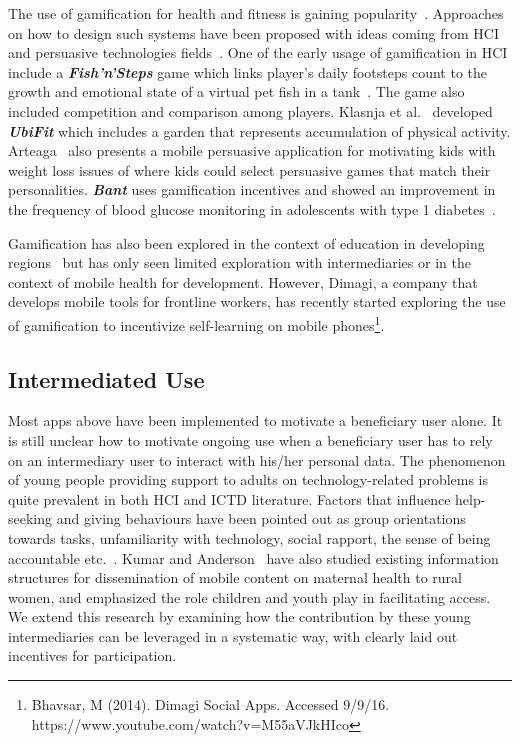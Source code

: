\documentclass{sig-alternate}
\begin{document}
The use of gamification for health and fitness is gaining popularity~\cite{lister2014:just}. Approaches on how to design such systems have been proposed with ideas coming from HCI~\cite{li2010:stage} and persuasive technologies fields~\cite{fogg2009:behaviour,Oinas-kukkonen:psd,Oinas-Kukkonen:foundation}. One of the early usage of gamification in HCI include a \emph{\textbf{Fish'n'Steps}} game which links player's daily footsteps count to the growth and emotional state of a virtual pet fish in a tank~\cite{lin2006:fish}. The game also included competition and comparison among players. Klasnja et al.~\cite{klasnja2009:using} developed \emph{\textbf{UbiFit}} which includes a garden that represents accumulation of physical activity. Arteaga~\cite{arteaga2010:persuasive} also presents a mobile persuasive application for motivating kids with weight loss issues of where kids could select persuasive games that match their personalities. \emph{\textbf{Bant}} uses gamification incentives and showed an improvement in the frequency of blood glucose monitoring in adolescents with type 1 diabetes~\cite{cafazzo2012:bant}. 

Gamification has also been explored in the context of education in developing regions~\cite{kam2008designing,botha2015icts} but has only seen limited exploration with intermediaries or in the context of mobile health for development.  However, Dimagi, a company that develops mobile tools for frontline workers, has recently started exploring the use of gamification to incentivize self-learning on mobile phones\footnote{Bhavsar, M (2014). Dimagi Social Apps. Accessed 9/9/16. https://www.youtube.com/watch?v=M55aVJkHIco}.

\subsection{Intermediated Use}
Most apps above have been implemented to motivate a beneficiary user alone. It is still unclear how to motivate ongoing use when a beneficiary user has to rely on an intermediary user to interact with his/her personal data. The phenomenon of young people providing support to adults on technology-related problems is quite prevalent in both HCI and ICTD literature. Factors that influence help-seeking and giving behaviours have been pointed out as group orientations towards tasks, unfamiliarity with technology, social rapport, the sense of being accountable etc.~\cite{sambasivan2010,poole:chh,kiesler:twi,parikh2006}. Kumar and Anderson~\cite{kumar2015mobile} have also studied existing information structures for dissemination of mobile content on maternal health to rural women, and emphasized the role children and youth play in facilitating access. 
We extend this research by examining how the contribution by these young intermediaries can be leveraged in a systematic way, with clearly laid out incentives for participation.  
\end{document}
